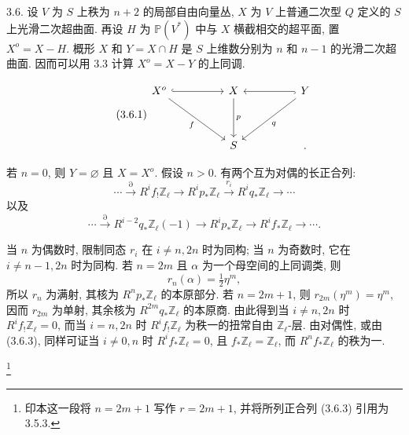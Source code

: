 3.6. 设 $V$ 为 $S$ 上秩为 $n+2$ 的局部自由向量丛, $X$ 为 $V$ 上普通二次型 $Q$ 定义的 $S$ 上光滑二次超曲面. 再设 $H$ 为 $\mathbb P(V^*)$ 中与 $X$ 横截相交的超平面, 置 $X^o=X-H$. 概形 $X$ 和 $Y=X\cap H$ 是 $S$ 上维数分别为 $n$ 和 $n-1$ 的光滑二次超曲面. 因而可以用 3.3 计算 $X^o=X-Y$ 的上同调.


\begin{equation}\tag{3.6.1}
\begin{tikzcd}[column sep=huge,row sep=huge]
X^o \arrow[r,hook] \arrow[rd,"f"']
  & X \arrow[d,"p"]
  & Y \arrow[l,hook] \arrow[ld,"q"]\\
{} & S & \mathord{.}
\end{tikzcd}
\end{equation}

若 $n=0$, 则 $Y=\varnothing$ 且 $X=X^o$. 假设 $n>0$. 有两个互为对偶的长正合列:
\begin{equation}\tag{3.6.2}
\cdots\xrightarrow{\partial}R^if_!\mathbb Z_\ell
\longrightarrow R^ip_*\mathbb Z_\ell
\xrightarrow{r_i}R^iq_*\mathbb Z_\ell\longrightarrow\cdots
\end{equation}
以及
\begin{equation}\tag{3.6.3}
\cdots\xrightarrow{\partial}R^{i-2}q_*\mathbb Z_\ell(-1)
\longrightarrow R^ip_*\mathbb Z_\ell
\longrightarrow R^if_*\mathbb Z_\ell\longrightarrow\cdots.
\end{equation}

当 $n$ 为偶数时, 限制同态 $r_i$ 在 $i\neq n,2n$ 时为同构; 当 $n$ 为奇数时, 它在 $i\neq n-1,2n$ 时为同构. 若 $n=2m$ 且 $\alpha$ 为一个母空间的上同调类, 则
\begin{equation*}
r_n(\alpha)=\tfrac12\eta^m,
\end{equation*}
所以 $r_n$ 为满射, 其核为 $R^np_*\mathbb Z_\ell$ 的本原部分. 若 $n=2m+1$, 则 $r_{2m}(\eta^m)=\eta^m$, 因而 $r_{2m}$ 为单射, 其余核为 $R^{2m}q_*\mathbb Z_\ell$ 的本原商. 由此得到当 $i\neq n,2n$ 时 $R^if_!\mathbb Z_\ell=0$, 而当 $i=n,2n$ 时 $R^if_!\mathbb Z_\ell$ 为秩一的扭常自由 $\mathbb Z_\ell$-层. 由对偶性, 或由 (3.6.3), 同样可证当 $i\neq0,n$ 时 $R^if_*\mathbb Z_\ell=0$, 且 $f_*\mathbb Z_\ell=\mathbb Z_\ell$, 而 $R^nf_*\mathbb Z_\ell$ 的秩为一.

\footnote{印本这一段将 $n=2m+1$ 写作 $r=2m+1$, 并将所列正合列 (3.6.3) 引用为 3.5.3.}

